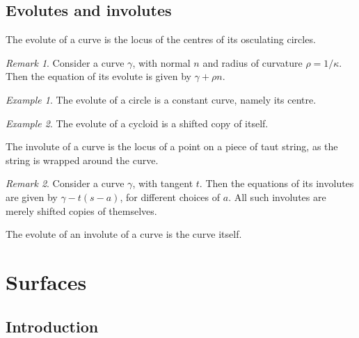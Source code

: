\documentclass[11pt]{article}
\theoremstyle{definition}
\theoremstyle{remark}
\newtheorem*{remark}{Remark}
\newtheorem*{example}{Example}
\numberwithin{equation}{section}
\begin{document}
    \subsection{Evolutes and involutes}
    
    \begin{definition}
        The evolute of a curve is the locus of the centres of its osculating circles.
        \begin{remark}
            Consider a curve $\gamma$, with normal $n$ and radius of curvature $\rho
            = 1 / \kappa$. Then the equation of its evolute is given by $\gamma +
            \rho n$.
        \end{remark}
    \end{definition}
    \begin{example}
        The evolute of a circle is a constant curve, namely its centre.
    \end{example}
    \begin{example}
        The evolute of a cycloid is a shifted copy of itself.
    \end{example}

    \begin{definition}
        The involute of a curve is the locus of a point on a piece of taut string, as
        the string is wrapped around the curve.
        \begin{remark}
            Consider a curve $\gamma$, with tangent $t$. Then the equations of its
            involutes are given by $\gamma - t(s - a)$, for different choices of $a$.
            All such involutes are merely shifted copies of themselves.
        \end{remark}
    \end{definition}

    \begin{theorem}
        The evolute of an involute of a curve is the curve itself.
    \end{theorem}



    \section{Surfaces}

    \subsection{Introduction}
\end{document}

